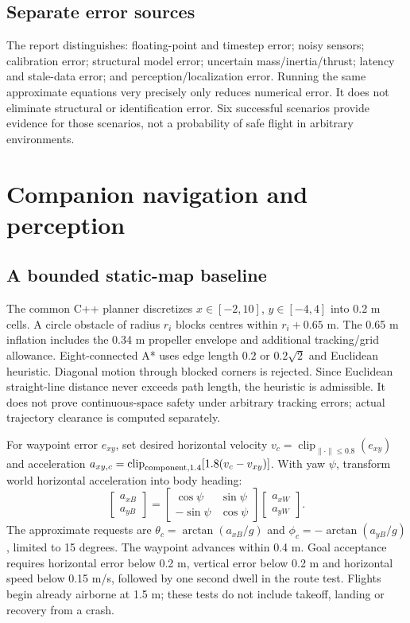 \section{Separate error sources}
The report distinguishes: floating-point and timestep error; noisy sensors;
calibration error; structural model error; uncertain mass/inertia/thrust;
latency and stale-data error; and perception/localization error. Running the
same approximate equations very precisely only reduces numerical error. It
does not eliminate structural or identification error. Six successful
scenarios provide evidence for those scenarios, not a probability of safe
flight in arbitrary environments.

\chapter{Companion navigation and perception}
\section{A bounded static-map baseline}
The common C++ planner discretizes $x\in[-2,10]$, $y\in[-4,4]$ into 0.2 m
cells. A circle obstacle of radius $r_i$ blocks centres within $r_i+0.65$ m.
The 0.65 m inflation includes the 0.34 m propeller envelope and additional
tracking/grid allowance. Eight-connected A* uses edge length $0.2$ or
$0.2\sqrt2$ and Euclidean heuristic. Diagonal motion through blocked corners
is rejected. Since Euclidean straight-line distance never exceeds path length,
the heuristic is admissible. It does not prove continuous-space safety under
arbitrary tracking errors; actual trajectory clearance is computed separately.

For waypoint error $e_{xy}$, set desired horizontal velocity
$v_c=\operatorname{clip}_{\|\cdot\|\leq0.8}(e_{xy})$ and acceleration
$a_{xy,c}=\operatorname{clip}_{\rm component,1.4}[1.8(v_c-v_{xy})]$.
With yaw $\psi$, transform world horizontal acceleration into body heading:
\begin{equation}
\begin{bmatrix}a_{xB}\\a_{yB}\end{bmatrix}
=\begin{bmatrix}\cos\psi&\sin\psi\\-\sin\psi&\cos\psi\end{bmatrix}
\begin{bmatrix}a_{xW}\\a_{yW}\end{bmatrix}.
\end{equation}
The approximate requests are $\theta_c=\arctan(a_{xB}/g)$ and
$\phi_c=-\arctan(a_{yB}/g)$, limited to 15 degrees. The waypoint advances
within 0.4 m. Goal acceptance requires horizontal error below 0.2 m,
vertical error below 0.2 m and horizontal speed below 0.15 m/s, followed by
one second dwell in the route test. Flights begin already airborne at 1.5 m;
these tests do not include takeoff, landing or recovery from a crash.

